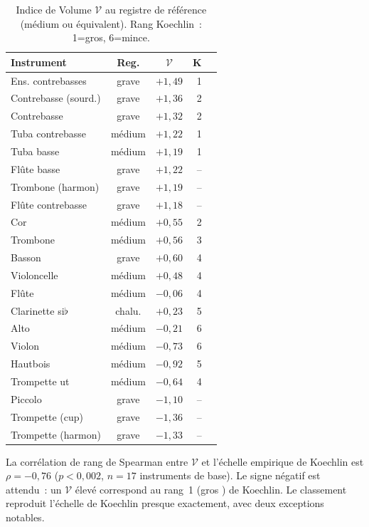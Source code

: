 \documentclass[journal]{IEEEtran}
\begin{document}
\begin{table}[!t]
\centering
\caption{Indice de Volume $\mathcal{V}$ au registre de référence (médium ou équivalent). Rang Koechlin~: 1=gros, 6=mince.}
\label{tab:volume_top}
\small
\begin{tabular}{@{}lccrc@{}}
\toprule
\textbf{Instrument} & \textbf{Reg.} & $\mathcal{V}$ & \textbf{K} \\
\midrule
Ens. contrebasses       & grave   & $+1{,}49$ & 1 \\
Contrebasse (sourd.)    & grave   & $+1{,}36$ & 2 \\
Contrebasse             & grave   & $+1{,}32$ & 2 \\
Tuba contrebasse        & médium  & $+1{,}22$ & 1 \\
Tuba basse              & médium  & $+1{,}19$ & 1 \\
Flûte basse             & grave   & $+1{,}22$ & -- \\
Trombone (harmon)       & grave   & $+1{,}19$ & -- \\
Flûte contrebasse       & grave   & $+1{,}18$ & -- \\
Cor                     & médium  & $+0{,}55$ & 2 \\
Trombone                & médium  & $+0{,}56$ & 3 \\
Basson                  & grave   & $+0{,}60$ & 4 \\
Violoncelle             & médium  & $+0{,}48$ & 4 \\
Flûte                   & médium  & $-0{,}06$ & 4 \\
Clarinette si$\flat$    & chalu.  & $+0{,}23$ & 5 \\
Alto                    & médium  & $-0{,}21$ & 6 \\
Violon                  & médium  & $-0{,}73$ & 6 \\
Hautbois                & médium  & $-0{,}92$ & 5 \\
Trompette ut            & médium  & $-0{,}64$ & 4 \\
Piccolo                 & grave   & $-1{,}10$ & -- \\
Trompette (cup)         & grave   & $-1{,}36$ & -- \\
Trompette (harmon)      & grave   & $-1{,}33$ & -- \\
\bottomrule
\end{tabular}
\end{table}

La corrélation de rang de Spearman entre $\mathcal{V}$ et l'échelle empirique de Koechlin est $\rho = -0{,}76$ ($p < 0{,}002$, $n = 17$ instruments de base). Le signe négatif est attendu~: un $\mathcal{V}$ élevé correspond au rang~1 (\og gros \fg) de Koechlin. Le classement reproduit l'échelle de Koechlin presque exactement, avec deux exceptions notables.
\end{document}
